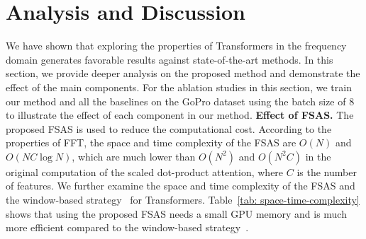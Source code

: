 \documentclass[10pt,twocolumn,letterpaper]{article}
\begin{document}
\begin{table}[!t]
  \caption{Quantitative evaluations of each component in the proposed method on the GoPro dataset~\cite{GoPro}.
  }
   \vspace{-3mm}
   \label{tab: effect-of-fsas}
\footnotesize
{}
\vspace{-5mm}
\end{table}


\vspace{-1mm}
\section{Analysis and Discussion}
\vspace{-1mm}
\label{sec:Ablation}
We have shown that exploring the properties of Transformers in the frequency domain generates favorable results against state-of-the-art methods.
In this section, we provide deeper analysis on the proposed method and demonstrate the effect of the main components.
For the ablation studies in this section, we train our method and all the baselines on the GoPro dataset using the batch size of $8$ to illustrate the effect of each component in our method.
\vspace{-2mm}
{\flushleft \textbf{Effect of FSAS.}}
The proposed FSAS is used to reduce the computational cost. According to the properties of FFT, the space and time complexity of the FSAS are $O(N)$ and $O(NC\log N)$,
which are much lower than $O(N^2)$ and $O(N^2C)$ in the original computation of the scaled dot-product attention, where $C$ is the number of features.
We further examine the space and time complexity of the FSAS and the window-based strategy~\cite{Swin,Uformer} for Transformers.
Table~\ref{tab: space-time-complexity} shows that using the proposed FSAS needs a small GPU memory and is much more efficient compared to the window-based strategy~\cite{Uformer}.
\end{document}
